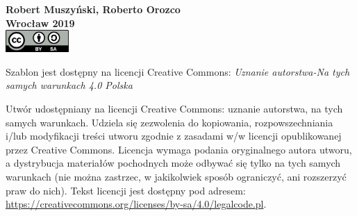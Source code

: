 \thispagestyle{empty}
\mbox{}
\vfill

\noindent
{\bf Robert Muszyński, Roberto Orozco}\\
{\bf Wrocław 2019}\\[2ex]
  \includegraphics[width=0.18\textwidth]{figures/CC-BY-SA_icon_svg.png}\hfill
\begin{minipage}[b]{0.79\textwidth}
 \small Szablon jest dostępny na licencji Creative Commons: \emph{Uznanie au\-tor\-stwa-Na tych samych warunkach 4.0 Polska}
\end{minipage}\vspace{2ex}

\noindent
{\normalsize Utwór udostępniany na licencji Creative Commons: uznanie
  autorstwa, na tych samych warunkach. Udziela się zezwolenia do
  kopiowania, rozpowszechniania i/lub modyfikacji treści utworu
  zgodnie z zasadami w/w licencji opublikowanej przez Creative
  Commons. Licencja wymaga podania oryginalnego autora utworu, a
  dystrybucja materiałów pochodnych może odbywać się tylko na tych
  samych warunkach (nie można zastrzec, w jakikolwiek sposób
  ograniczyć, ani rozszerzyć praw do nich). Tekst licencji jest
  dostępny pod adresem:
  \url{https://creativecommons.org/licenses/by-sa/4.0/legalcode.pl}.}
